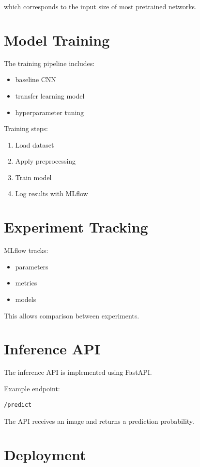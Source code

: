 ﻿\documentclass[11pt]{article}
\begin{document}
which corresponds to the input size of most pretrained networks.

\section{Model Training}

The training pipeline includes:

\begin{itemize}
\item baseline CNN
\item transfer learning model
\item hyperparameter tuning
\end{itemize}

Training steps:

\begin{enumerate}
\item Load dataset
\item Apply preprocessing
\item Train model
\item Log results with MLflow
\end{enumerate}

\section{Experiment Tracking}

MLflow tracks:

\begin{itemize}
\item parameters
\item metrics
\item models
\end{itemize}

This allows comparison between experiments.

\section{Inference API}

The inference API is implemented using FastAPI.

Example endpoint:

\begin{verbatim}
/predict
\end{verbatim}

The API receives an image and returns a prediction probability.

\section{Deployment}
\end{document}
